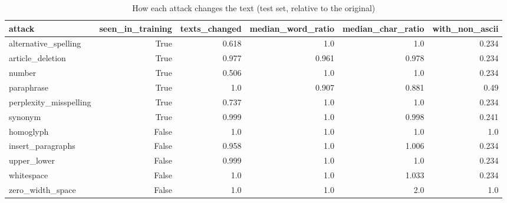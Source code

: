 \begin{table}[!t]
\centering
\caption{How each attack changes the text (test set, relative to the original)}
\label{tab:attack_effects}
\footnotesize
\begin{tabular}{lrrrrr}
\toprule
\textbf{attack} & \textbf{seen\_in\_training} & \textbf{texts\_changed} & \textbf{median\_word\_ratio} & \textbf{median\_char\_ratio} & \textbf{with\_non\_ascii} \\
\midrule
alternative\_spelling & True & 0.618 & 1.0 & 1.0 & 0.234 \\
article\_deletion & True & 0.977 & 0.961 & 0.978 & 0.234 \\
number & True & 0.506 & 1.0 & 1.0 & 0.234 \\
paraphrase & True & 1.0 & 0.907 & 0.881 & 0.49 \\
perplexity\_misspelling & True & 0.737 & 1.0 & 1.0 & 0.234 \\
synonym & True & 0.999 & 1.0 & 0.998 & 0.241 \\
homoglyph & False & 1.0 & 1.0 & 1.0 & 1.0 \\
insert\_paragraphs & False & 0.958 & 1.0 & 1.006 & 0.234 \\
upper\_lower & False & 0.999 & 1.0 & 1.0 & 0.234 \\
whitespace & False & 1.0 & 1.0 & 1.033 & 0.234 \\
zero\_width\_space & False & 1.0 & 1.0 & 2.0 & 1.0 \\
\bottomrule
\end{tabular}
\end{table}
